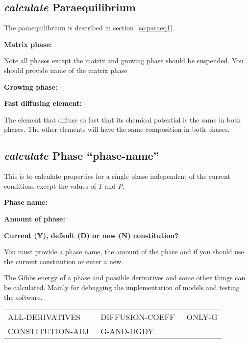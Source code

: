 \documentclass[11pt]{article}
\begin{document}
\subsection{{\em calculate} Paraequilibrium}\label{sc:paraeq2}

The paraequilibrium is described in section~\ref{sc:paraeq1}.

{\bf Matrix phase:}
              
Note all phases except the matrix and growing phase should be
suspended.  You should provide name of the matrix phase

{\bf Growing phase:}

{\bf Fast diffusing element:}

The element that diffuse so fast that its chemical potential is the
same in both phases.  The other elements will have the same
composition in both phases.

\hypertarget{Calculate what for}{}
\hypertarget{Calculate phase}{}
\subsection{{\em calculate} Phase ``phase-name''}

This is to calculate properties for a single phase independent of the
current conditions except the values of $T$ and $P$.

{\bf Phase name:}

{\bf Amount of phase:}

{\bf Current (Y), default (D) or new (N) constitution?}

You must provide a phase name, the amount of the phase and if you
should use the current constitution or enter a new.


The Gibbs energy of a phase and possible derivatives and some other
things can be calculated.  Mainly for debugging the implementation of
models and testing the software.

{\small
\begin{tabular}{lll}
ALL-DERIVATIVES  & DIFFUSION-COEFF~ & ONLY-G   \\
CONSTITUTION-ADJ~ & G-AND-DGDY        \\
\end{tabular}
}
\end{document}
